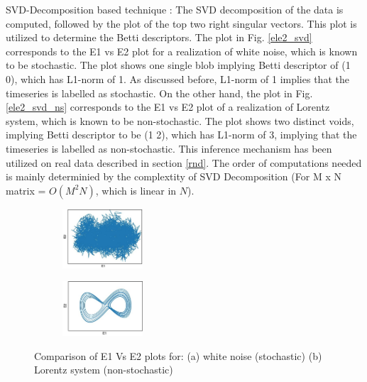 \documentclass[journal]{IEEEtran}
\begin{document}
	SVD-Decomposition based technique : The SVD decomposition of the data is computed, followed by the plot of the top two right singular vectors. This plot is utilized to determine the Betti descriptors. The plot in Fig. \ref{ele2_svd} corresponds to the E1 vs E2 plot for a realization of white noise, which is known to be stochastic. The plot shows one single blob implying Betti descriptor of (1 0), which has L1-norm of 1. As discussed before,  L1-norm of 1 implies that the timeseries is labelled as stochastic. On the other hand, the plot in Fig. \ref{ele2_svd_ns} corresponds to the E1 vs E2 plot of a realization of Lorentz system, which is known to be non-stochastic.  The plot shows two distinct voids, implying Betti descriptor to be (1 2), which has L1-norm of 3, implying that the timeseries is labelled as non-stochastic. This inference mechanism has been utilized on real data described in section \ref{rnd}.
	The order of computations needed is mainly determinied by the complextity of SVD Decomposition (For M x N matrix = $O(M^2N)$, which is linear in $N$).

%		
%		

\begin{figure}
	\centering
	
	\begin{subfigure}[]
		\centering
		\includegraphics[width=3cm]{svd_white_noise_crop.jpg}
	\end{subfigure}
	\begin{subfigure}[]
		\centering
		\includegraphics[width=3cm]{Lorenz_e1_vs_e2_2_2.JPG}
	\end{subfigure}
	\caption{Comparison of E1 Vs E2 plots for: (a) white noise (stochastic) (b) Lorentz system (non-stochastic)}
	\label{e1e2plots}
	\end{figure}
	
\end{document}
